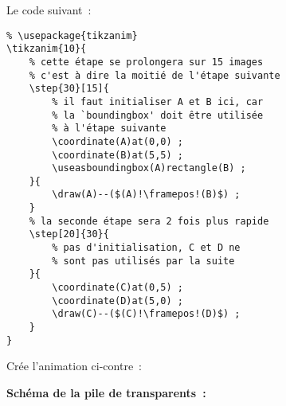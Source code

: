 \documentclass[a4paper,12pt]{article}
\begin{document}
	\begin{multicols}{2}
	{Le code suivant~:}
	\begin{lstlisting}
% \usepackage{tikzanim}
\tikzanim{10}{
	% cette étape se prolongera sur 15 images
	% c'est à dire la moitié de l'étape suivante
	\step{30}[15]{
		% il faut initialiser A et B ici, car
		% la `boundingbox' doit être utilisée
		% à l'étape suivante
		\coordinate(A)at(0,0) ;
		\coordinate(B)at(5,5) ;
		\useasboundingbox(A)rectangle(B) ;
	}{
		\draw(A)--($(A)!\framepos!(B)$) ;
	}
	% la seconde étape sera 2 fois plus rapide
	\step[20]{30}{
		% pas d'initialisation, C et D ne
		% sont pas utilisés par la suite
	}{
		\coordinate(C)at(0,5) ;
		\coordinate(D)at(5,0) ;
		\draw(C)--($(C)!\framepos!(D)$) ;
	}
}
	\end{lstlisting}
	
	{Crée l'animation ci-contre~:}
	
	\bigskip
	
	\centering
	
	\end{multicols}
	
	\textbf{Schéma de la pile de transparents~:}
	
	\medskip
	
\newcommand{\transparentliste}[2]{
	\stepcounter{dy}	
	\foreach\f in {#1}{
		\pgfmathsetmacro{\c}{\f*5}
		\path[draw=black,fill=teal!\c!purple!75!white,fill opacity=0.75] (\f*0.1,-\thedy*0.8)node(a){} -- ++(0,0.6) -- ++(0.3,0.3)node(b){} -- ++(0,-0.6) -- cycle ;
		\path(a)--node[midway,font=\tiny,shape=rectangle]{\f} (b) ;
	}
	\node[anchor=west,shape=rectangle] at(2.5,0.4-\thedy*0.8) {#2#1} ;
}

\newcommand{\acc}[4][0pt]{
		\draw[decorate,decoration={brace,amplitude=10pt},thick,xshift=#1] (12,-0.8*#2-0.05) --node[right,xshift=10pt,text width=7cm,font=\ttfamily,shape=rectangle]{#4} (12,-0.8*#3+0.05);
}

\newcommand{\entoure}[4][]{
	\filldraw[red,thick,densely dashed,fill opacity=0.333,#1] (#2*0.1-0.05,-#4*0.8-0.125) -- ++(0,{(#4-#3+1)*0.8-0.05}) -- ++(0.4,0.4) -- ++ (0,{-(#4-#3+1)*0.8+0.05}) -- cycle ;
}
\end{document}

